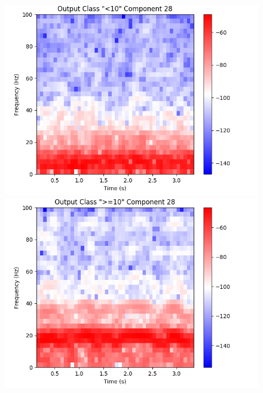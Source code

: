 \documentclass[fleqn,10pt]{wlscirep}
\begin{document}
\begin{figure}[t!]
\begin{minipage}{0.24\textwidth}
    \includegraphics[width=\linewidth]{max_act/artificial_spec_28_0.png}
    \subcaption{}
  \end{minipage}
  \hspace*{\fill} 
  \begin{minipage}{0.24\textwidth}
    \includegraphics[width=\linewidth]{max_act/artificial_spec_28_1.png}
    \subcaption{}
  \end{minipage}
  \begin{minipage}{0.24\textwidth}

\end{minipage}
\end{figure}
\end{document}
